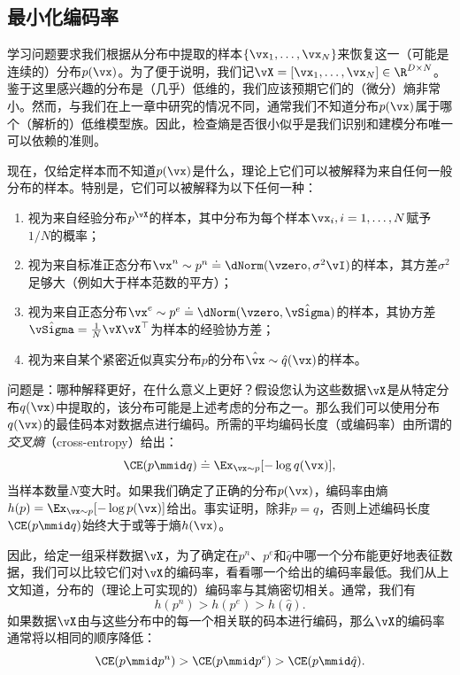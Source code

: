 \documentclass[../../book-main_zh.tex]{subfiles}
\begin{document}
\subsection{最小化编码率}\label{sub:min_entropy}

学习问题要求我们根据从分布中提取的样本\(\{\vx_{1}, \ldots, \vx_{N}\}\)来恢复这一（可能是连续的）分布\(p(\vx)\)。为了便于说明，我们记\(\vX = [\vx_{1}, \ldots, \vx_{N}] \in \R^{D\times N}\)。鉴于这里感兴趣的分布是（几乎）低维的，我们应该预期它们的（微分）熵非常小。然而，与我们在上一章中研究的情况不同，通常我们不知道分布\(p(\vx)\)属于哪个（解析的）低维模型族。因此，检查熵是否很小似乎是我们识别和建模分布唯一可以依赖的准则。

现在，仅给定样本而不知道\(p(\vx)\)是什么，理论上它们可以被解释为来自任何一般分布的样本。特别是，它们可以被解释为以下任何一种：
\begin{enumerate}
    \item 视为来自经验分布\(p^{\vX}\)的样本，其中分布为每个样本\(\vx_{i}, i=1, \ldots, N\)赋予\(1/N\)的概率；
    \item 视为来自标准正态分布\(\vx^{n} \sim p^{n} \doteq \dNorm(\vzero, \sigma^{2} \vI)\)的样本，其方差\(\sigma^{2}\)足够大（例如大于样本范数的平方）；
    \item 视为来自正态分布\(\vx^{e} \sim p^{e} \doteq \dNorm(\vzero, \hat{\vSigma})\)的样本，其协方差\(\hat{\vSigma} = \frac{1}{N} \vX \vX^{\top}\)为样本的经验协方差；
    \item 视为来自某个紧密近似真实分布\(p\)的分布\(\hat \vx \sim \hat{q}(\vx)\)的样本。
\end{enumerate}
问题是：哪种解释更好，在什么意义上更好？假设您认为这些数据\(\vX\)是从特定分布\(q(\vx)\)中提取的，该分布可能是上述考虑的分布之一。那么我们可以使用分布\(q(\vx)\)的最佳码本对数据点进行编码。所需的平均编码长度（或编码率）由所谓的\textit{交叉熵}（cross-entropy）给出：
\begin{equation}
    \CE(p \mmid q) \doteq \Ex_{\vx \sim p}[-\log q(\vx)],
\end{equation}
当样本数量\(N\)变大时。如果我们确定了正确的分布\(p(\vx)\)，编码率由熵\(h(p) = \Ex_{\vx \sim p}[-\log p(\vx)]\)给出。事实证明，除非\(p = q\)，否则上述编码长度\(\CE(p \mmid q)\)始终大于或等于熵\(h(\vx)\)。

因此，给定一组采样数据\(\vX\)，为了确定在\(p^{n}\)、\(p^{e}\)和\(\hat{q}\)中哪一个分布能更好地表征数据，我们可以比较它们对\(\vX\)的编码率，看看哪一个给出的编码率最低。我们从上文知道，分布的（理论上可实现的）编码率与其熵密切相关。通常，我们有
\begin{equation}
    h(p^{n}) > h(p^{e}) > h(\hat{q}).
\end{equation}
如果数据\(\vX\)由与这些分布中的每一个相关联的码本进行编码，那么\(\vX\)的编码率通常将以相同的顺序降低：
\begin{equation}
    \CE(p \mmid p^{n}) > \CE(p \mmid p^{e}) > \CE(p \mmid \hat{q}).
\end{equation}
\end{document}
